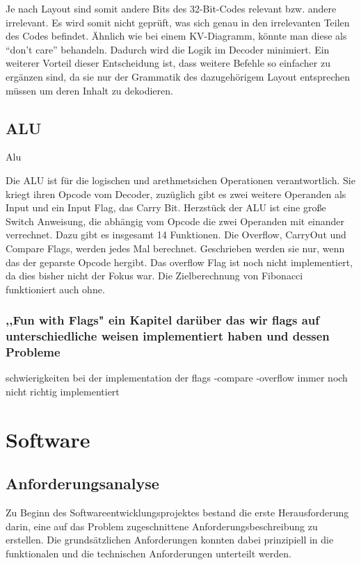 \documentclass[paper=a4,fontsize=12pt,twocolumn]{scrreprt}
\begin{document}
Je nach Layout sind somit andere Bits des 32-Bit-Codes relevant bzw. andere irrelevant. Es wird somit nicht geprüft, was sich genau in den irrelevanten Teilen des Codes befindet. Ähnlich wie bei einem KV-Diagramm, könnte man diese als  \enquote{don't care} behandeln. Dadurch wird die Logik im Decoder minimiert. 
Ein weiterer Vorteil dieser Entscheidung ist, dass weitere Befehle so einfacher zu ergänzen sind, da sie nur der Grammatik des dazugehörigem Layout entsprechen müssen um deren Inhalt zu dekodieren.  




\section{ALU}

Alu

Die ALU ist für die logischen und arethmetsichen Operationen verantwortlich.
Sie kriegt ihren Opcode vom Decoder, zuzüglich gibt es zwei weitere Operanden als Input und ein Input Flag, das Carry Bit.
Herzstück der ALU ist eine große Switch Anweisung, die abhängig vom Opcode die zwei Operanden mit einander verrechnet.
Dazu gibt es insgesamt 14 Funktionen. 
Die Overflow, CarryOut und Compare Flags, werden jedes Mal berechnet. Geschrieben werden sie nur, wenn das der geparste Opcode hergibt.
Das overflow Flag ist noch nicht implementiert, da dies bisher nicht der Fokus war. Die Zielberechnung von Fibonacci funktioniert auch ohne.

\subsection{,,Fun with Flags" ein Kapitel darüber das wir flags auf unterschiedliche weisen implementiert haben und dessen Probleme}

schwierigkeiten bei der implementation der flags
-compare
-overflow immer noch nicht richtig implementiert

\chapter{Software}

\section{Anforderungsanalyse}
Zu Beginn des Softwareentwicklungsprojektes bestand die erste Herausforderung darin, eine auf das Problem zugeschnittene Anforderungsbeschreibung zu erstellen.
Die grundsätzlichen Anforderungen konnten dabei prinzipiell in die funktionalen und die technischen Anforderungen unterteilt werden. 
\end{document}

